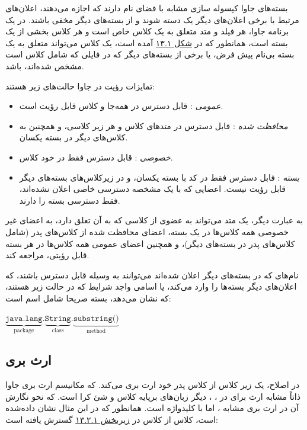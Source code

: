 \documentclass[a4paper,12pt]{report}
\newcommand{\lrm}[1]{{\color{steelBlue}\lr{\texttt{#1}}}}
\begin{document}
	بسته‌های جاوا کپسوله سازی مشابه با فضای نام 
	دارند که اجازه می‌دهند، اعلان‌های مرتبط با برخی اعلان‌های دیگر یک دسته شوند و از بسته‌های دیگر مخفی باشند. 
در یک برنامه جاوا، هر فیلد و متد متعلق به یک کلاس خاص است و هر کلاس بخشی از یک بسته است، همانطور که در 
	\hyperref[fig1:subsec2:sec2:chap13]{
	شکل ۱۳.۱}
	\linebreak
 آمده است، یک کلاس می‌تواند متعلق به یک بسته بی‌نام پیش فرض،‌ یا برخی از بسته‌های دیگر که در فایلی که شامل کلاس است مشخص شده‌اند، باشد.

	تمایزات رؤیت
	 در جاوا حالت‌های زیر هستند:
\begin{itemize}[nosep]
	\renewcommand{\labelitemi}{\color{gray}\scriptsize$\blacksquare$}
	\item
	\textit{
	عمومی
}: قابل دسترس در همه‌جا و کلاس قابل رؤیت است.
	\item\textit{
	محافظت شده
}: قابل دسترس در متد‌های کلاس و هر زیر کلاسی، و همچنین به کلاس‌های دیگر در بسته یکسان. 
	\item\textit{
	خصوصی
}: قابل دسترس فقط در خود کلاس.
	\item\textit{
		بسته
}: فابل دسترس فقط در کد با بسته یکسان، و در زیرکلاس‌های بسته‌های دیگر قابل رؤیت نیست. اعضایی که با یک مشخصه دسترسی خاصی اعلان نشده‌اند، فقط دسترسی بسته را دارند.
\end{itemize}

	به عبارت دیگر، یک متد می‌تواند به عضوی از کلاسی که به آن تعلق دارد، به اعضای غیر خصوصی همه کلاس‌ها در یک بسته، اعضای محافظت شده از کلاس‌های پدر (شامل کلاس‌های پدر در بسته‌های دیگر)، و همچنین اعضای عمومی همه کلاس‌ها در هر بسته قابل رؤیتی، مراجعه کند.
	
	نام‌های که در بسته‌های دیگر اعلان شده‌اند می‌توانند به وسیله 
	\lrm{import}
	قابل دسترس باشند، که اعلان‌های دیگر بسته‌ها را وارد می‌کند، یا اسامی واجد شرایط که در حالت زیر هستند، که  نشان می‌دهد، بسته صریحا شامل اسم است:  

\begin{latin}
	\color{steelBlue}
	$\underbrace{\texttt{java.lang}}_{\text{package}}.
	\underbrace{\texttt{String}}_{\text{class}}.
	\underbrace{\texttt{substring()}}_{\text{method}}$
\end{latin}

\subsection{
	ارث بری}
\label{subsec3:sec2:chap13}
	در اصلاح، یک زیر کلاس از کلاس پدر خود ارث ‌بری می‌کند. که مکانیسم ارث بری جاوا ذاتاً مشابه ارث برای در 
	، 
	، دیگر زبان‌های برپایه کلاس و شئ کرا است. که نحو نگارش آن در ارث بری مشابه 
	، اما با کلیدواژه 
	\lrm{extends}
	است. همانطور که در این مثال نشان داده‌شده است، کلاس 
	\lrm{ColorPoint}
	از کلاس 
	\lrm{Point}
	در 
	\hyperref[subsec1:sec2:chap13]{
	زیربخش ۱۳.۲.۱} گسترش یافته است:
\end{document}
